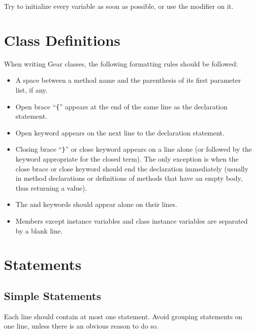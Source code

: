 Try to initialize every variable as soon as possible, or use the  modifier on it. 






\section{Class Definitions}

When writing Gear classes, the following formatting rules should be followed: 
\begin{itemize}
  \item A space between a method name and the parenthesis of its first parameter list, if any. 
  \item Open brace ``\lstinline!{!'' appears at the end of the same line as the declaration statement. 
  \item Open keyword  appears on the next line to the declaration statement. 
  \item Closing brace ``\lstinline!}!'' or close keyword  appears on a line alone (or followed by the keyword appropriate for the closed term). The only exception is when the close brace or close keyword should end the declaration immediately (usually in method declarations or definitions of methods that have an empty body, thus returning a  value). 
  \item The  and  keywords should appear alone on their lines. 
  \item Members except instance variables and class instance variables are separated by a blank line. 
\end{itemize}





\section{Statements}






\subsection{Simple Statements}

Each line should contain at most one statement. Avoid grouping statements on one line, unless there is an obvious reason to do so. 





